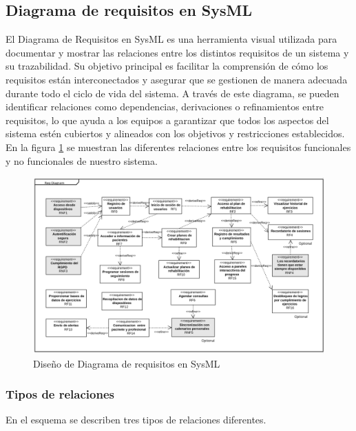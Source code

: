 \documentclass{article}
\begin{document}
\subsection{Diagrama de requisitos en  SysML}

El Diagrama de Requisitos en SysML es una herramienta visual utilizada para documentar y mostrar las relaciones entre los distintos requisitos de un sistema y su trazabilidad. Su objetivo principal es facilitar la comprensión de cómo los requisitos están interconectados y asegurar que se gestionen de manera adecuada durante todo el ciclo de vida del sistema. A través de este diagrama, se pueden identificar relaciones como dependencias, derivaciones o refinamientos entre requisitos, lo que ayuda a los equipos a garantizar que todos los aspectos del sistema estén cubiertos y alineados con los objetivos y restricciones establecidos.
\\

En la figura \ref{fig:SysML} se muestran las diferentes relaciones entre los requisitos funcionales y no funcionales de nuestro sistema.

\begin{figure}
	\begin{center} 
		\includegraphics[width=1\textwidth]{images/SysML.png}
		\caption{Diseño de Diagrama de requisitos en SysML}
		\label{fig:SysML}
	\end{center}
\end{figure}
\vspace{5cm}

\subsubsection{Tipos de relaciones}
En el esquema se describen tres tipos de relaciones diferentes.
\end{document}
